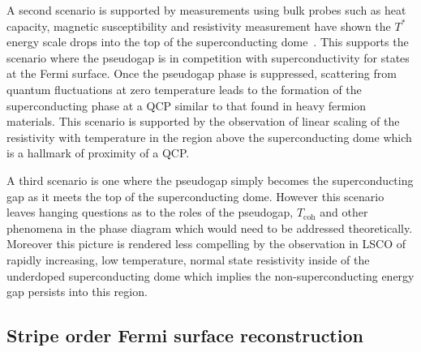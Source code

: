A second scenario is supported by measurements using bulk probes such as heat capacity, magnetic susceptibility and resistivity measurement have shown the $T^*$ energy scale drops into the top of the superconducting dome~\cite{Tallon2001}. This supports the scenario where the pseudogap is in competition with superconductivity for states at the Fermi surface. Once the pseudogap phase is suppressed, scattering from quantum fluctuations at zero temperature leads to the formation of the superconducting phase at a \ac{QCP} similar to that found in heavy fermion materials. This scenario is supported by the observation of linear scaling of the resistivity with temperature in the region above the superconducting dome which is a hallmark of proximity of a \ac{QCP}.

A third scenario is one where the pseudogap simply becomes the superconducting gap as it meets the top of the superconducting dome. However this scenario leaves hanging questions as to the roles of the pseudogap, $T_{\textrm{coh}}$ and other phenomena in the phase diagram which would need to be addressed theoretically. Moreover this picture is rendered less compelling by the observation in \ac{LSCO} of rapidly increasing, low temperature, normal state resistivity inside of the underdoped superconducting dome which implies the non-superconducting energy gap persists into this region.

\subsection{Stripe order Fermi surface reconstruction}
\label{Sec:Intro:StripeOrderReconstruction}

